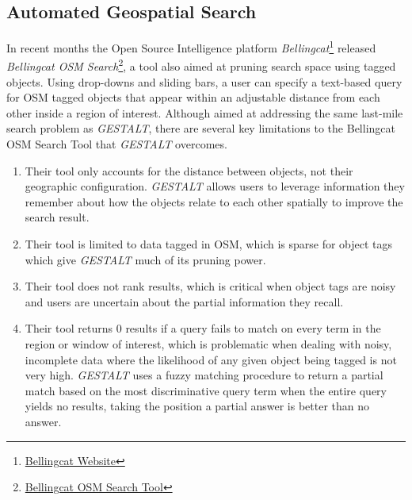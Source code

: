 \subsection{Automated Geospatial Search}
In recent months the Open Source Intelligence platform \textit{Bellingcat}\footnote{\href{https://www.bellingcat.com/about/who-we-are/}{Bellingcat Website}} released \textit{Bellingcat OSM Search}\footnote{\href{https://osm-search.bellingcat.com/}{Bellingcat OSM Search Tool}}\cite{Williams2023}, a tool also aimed at pruning search space using tagged objects. 
Using drop-downs and sliding bars, a user can specify a text-based query for OSM tagged objects that appear within an adjustable distance from each other inside a region of interest. 
Although aimed at addressing the same last-mile search problem as \emph{GESTALT}, there are several key limitations to the Bellingcat OSM Search Tool that \emph{GESTALT} overcomes.
\begin{enumerate}
    \item Their tool only accounts for the distance between objects, not their geographic configuration. \emph{GESTALT} allows users to leverage information they remember about how the objects relate to each other spatially to improve the search result.
    \item Their tool is limited to data tagged in OSM, which is sparse for object tags which give \emph{GESTALT} much of its pruning power.
    \item Their tool does not rank results, which is critical when object tags are noisy and users are uncertain about the partial information they recall.
    \item Their tool returns 0 results if a query fails to match on every term in the region or window of interest, which is problematic when dealing with noisy, incomplete data where the likelihood of any given object being tagged is not very high. 
    \emph{GESTALT} uses a fuzzy matching procedure to return a partial match based on the most discriminative query term when the entire query yields no results, taking the position a partial answer is better than no answer.
\end{enumerate}


